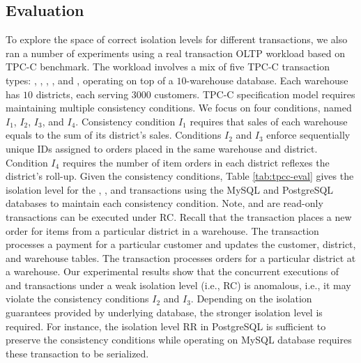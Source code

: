\subsection{Evaluation}

To explore the space of correct isolation levels for different transactions, we  also  ran a number  of experiments using  a real transaction OLTP workload   based on TPC-C benchmark.  
 The  workload  involves  a mix of five TPC-C transaction types: 
,  ,  , , and  , 
operating on top of  a $10$-warehouse database.  
Each warehouse has  $10$ districts, each serving $3000$ customers. 
TPC-C  specification model  requires  maintaining multiple   consistency conditions.  We focus  on   four conditions, named $I_1$, $I_2$, $I_3$, and $I_4$.   
Consistency condition $I_1$  requires that  sales of each  warehouse  equals to the  sum of    its  district's sales.  Conditions $I_2$ and $I_3$  enforce  
 sequentially unique IDs assigned to  orders placed in the same   warehouse and district. Condition $I_4$ requires 
 the  number of  item orders   in each district 
  reflexes  the district's roll-up. 
Given the consistency conditions,  Table  \ref{tab:tpcc-eval} gives the isolation level  for the ,  ,  and  transactions using the  MySQL and PostgreSQL databases   to maintain   each consistency condition. Note,    and     are read-only transactions can be executed under RC.   
Recall that the  transaction places a new order for
 items from a particular district in a warehouse.  
The  transaction  processes  a payment for a particular customer and updates the customer, district, and warehouse tables. 
 The    transaction processes  orders for a particular   district at  a warehouse. 
 Our experimental results  show that  the concurrent executions of      
    and   transactions under a weak isolation level (i.e.,  RC) is anomalous, i.e., it may violate the consistency conditions $I_2$ and $I_3$. Depending on the isolation guarantees provided  by  underlying database,   the stronger  isolation level is required. For instance, the isolation level RR in PostgreSQL  is sufficient to preserve the consistency  conditions while  operating on MySQL database  requires  these transaction to be serialized.  


